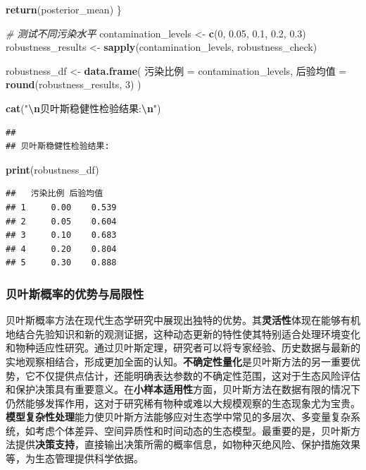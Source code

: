\documentclass[
]{book}
\newenvironment{Shaded}{\begin{snugshade}}{\end{snugshade}}
\newcommand{\CommentTok}[1]{\textcolor[rgb]{0.56,0.35,0.01}{\textit{#1}}}
\newcommand{\DecValTok}[1]{\textcolor[rgb]{0.00,0.00,0.81}{#1}}
\newcommand{\FloatTok}[1]{\textcolor[rgb]{0.00,0.00,0.81}{#1}}
\newcommand{\FunctionTok}[1]{\textcolor[rgb]{0.13,0.29,0.53}{\textbf{#1}}}
\newcommand{\NormalTok}[1]{#1}
\newcommand{\OtherTok}[1]{\textcolor[rgb]{0.56,0.35,0.01}{#1}}
\newcommand{\SpecialCharTok}[1]{\textcolor[rgb]{0.81,0.36,0.00}{\textbf{#1}}}
\newcommand{\StringTok}[1]{\textcolor[rgb]{0.31,0.60,0.02}{#1}}
\begin{document}
\begin{Shaded}
\begin{Highlighting}[]
  \FunctionTok{return}\NormalTok{(posterior\_mean)}
\NormalTok{\}}

\CommentTok{\# 测试不同污染水平}
\NormalTok{contamination\_levels }\OtherTok{\textless{}{-}} \FunctionTok{c}\NormalTok{(}\DecValTok{0}\NormalTok{, }\FloatTok{0.05}\NormalTok{, }\FloatTok{0.1}\NormalTok{, }\FloatTok{0.2}\NormalTok{, }\FloatTok{0.3}\NormalTok{)}
\NormalTok{robustness\_results }\OtherTok{\textless{}{-}} \FunctionTok{sapply}\NormalTok{(contamination\_levels, robustness\_check)}

\NormalTok{robustness\_df }\OtherTok{\textless{}{-}} \FunctionTok{data.frame}\NormalTok{(}
\NormalTok{  污染比例 }\OtherTok{=}\NormalTok{ contamination\_levels,}
\NormalTok{  后验均值 }\OtherTok{=} \FunctionTok{round}\NormalTok{(robustness\_results, }\DecValTok{3}\NormalTok{)}
\NormalTok{)}

\FunctionTok{cat}\NormalTok{(}\StringTok{"}\SpecialCharTok{\textbackslash{}n}\StringTok{贝叶斯稳健性检验结果:}\SpecialCharTok{\textbackslash{}n}\StringTok{"}\NormalTok{)}
\end{Highlighting}
\end{Shaded}

\begin{verbatim}
## 
## 贝叶斯稳健性检验结果:
\end{verbatim}

\begin{Shaded}
\begin{Highlighting}[]
\FunctionTok{print}\NormalTok{(robustness\_df)}
\end{Highlighting}
\end{Shaded}

\begin{verbatim}
##   污染比例 后验均值
## 1     0.00    0.539
## 2     0.05    0.604
## 3     0.10    0.683
## 4     0.20    0.804
## 5     0.30    0.888
\end{verbatim}

\hypertarget{ux8d1dux53f6ux65afux6982ux7387ux7684ux4f18ux52bfux4e0eux5c40ux9650ux6027}{%
\subsubsection{贝叶斯概率的优势与局限性}\label{ux8d1dux53f6ux65afux6982ux7387ux7684ux4f18ux52bfux4e0eux5c40ux9650ux6027}}

贝叶斯概率方法在现代生态学研究中展现出独特的优势。其\textbf{灵活性}体现在能够有机地结合先验知识和新的观测证据，这种动态更新的特性使其特别适合处理环境变化和物种适应性研究。通过贝叶斯定理，研究者可以将专家经验、历史数据与最新的实地观察相结合，形成更加全面的认知。\textbf{不确定性量化}是贝叶斯方法的另一重要优势，它不仅提供点估计，还能明确表达参数的不确定性范围，这对于生态风险评估和保护决策具有重要意义。在\textbf{小样本适用性}方面，贝叶斯方法在数据有限的情况下仍然能够发挥作用，这对于研究稀有物种或难以大规模观察的生态现象尤为宝贵。\textbf{模型复杂性处理}能力使贝叶斯方法能够应对生态学中常见的多层次、多变量复杂系统，如考虑个体差异、空间异质性和时间动态的生态模型。最重要的是，贝叶斯方法提供\textbf{决策支持}，直接输出决策所需的概率信息，如物种灭绝风险、保护措施效果等，为生态管理提供科学依据。
\end{document}
